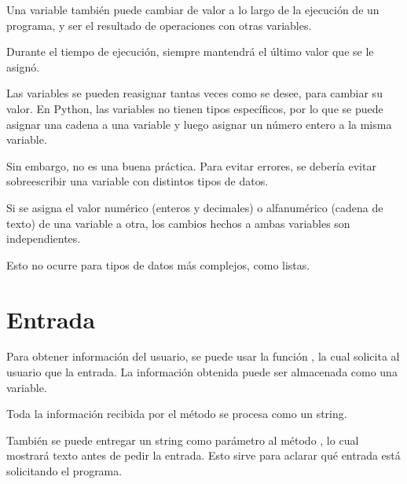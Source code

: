 Una variable también puede cambiar de valor a lo largo de la ejecución de un programa, y ser el resultado de operaciones con otras variables.


Durante el tiempo de ejecución, siempre mantendrá el último valor que se le asignó.


Las variables se pueden reasignar tantas veces como se desee, para cambiar su valor.
En Python, las variables no tienen tipos específicos, por lo que se puede asignar una cadena a una variable y luego asignar un número entero a la misma variable.


Sin embargo, no es una buena práctica.
Para evitar errores, se debería evitar sobreescribir una variable con distintos tipos de datos.
\medskip

Si se asigna el valor numérico (enteros y decimales) o alfanumérico (cadena de texto) de una variable a otra, los cambios hechos a ambas variables son independientes.


Esto no ocurre para tipos de datos más complejos, como listas.

\section{Entrada}

Para obtener información del usuario, se puede usar la función , la cual solicita al usuario que la entrada.
La información obtenida puede ser almacenada como una variable.


Toda la información recibida por el método  se procesa como un string.
\medskip

También se puede entregar un string como parámetro al método , lo cual mostrará texto antes de pedir la entrada.
Esto sirve para aclarar qué entrada está solicitando el programa.


